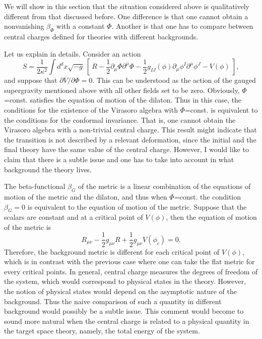 \documentclass[a4paper,a4paper]{article}
\begin{document}
We will show in this section that the situation considered above is qualitatively different from that 
discussed before. 
One difference is that one cannot obtain a nonvanishing $\beta_{\Phi}$ with a constant $\Phi$. 
Another is that one has to compare between central charges defined for theories with different backgrounds. 

Let us explain in details. 
Consider an action
\begin{equation}
S = \frac1{2\kappa^2}\int d^dx\sqrt{-g}\ \left[ \ R-\frac12\partial_\mu\Phi\partial^\mu\Phi
   -\frac12g_{IJ}(\phi)\partial_\mu\phi^I\partial^\mu\phi^J-V(\phi) \ \right],
\end{equation}
and suppose that $\partial V/\partial \Phi=0$. 
This can be understood as the action of the gauged supergravity mentioned above with all other fields set to be 
zero. 
Obviously, $\Phi$=const. satisfies the equation of motion of the dilaton. 
Thus in this case, the conditions for the existence of the Virasoro algebra with $\Phi$=const. is equivalent 
to the conditions for the conformal invariance. 
That is, one cannot obtain the Virasoro algebra with a non-trivial central charge. 
This result might indicate that the transition is not described by a relevant deformation, since the initial and 
the final theory have the same value of the central charge. 
However, I would like to claim that there is a subtle issue and one has to take into account in what background 
the theory lives. 

The beta-functional $\beta_G$ of the metric is a linear combination of the equations of motion of the metric and 
the dilaton, and thus when $\Phi$=const. the condition $\beta_G=0$ is equivalent to the equation of motion 
of the metric. 
Suppose that the scalars are constant and at a critical point of $V(\phi)$, then the equation of motion of the 
metric is 
\begin{equation}
R_{\mu\nu}-\frac12g_{\mu\nu}R+\frac12g_{\mu\nu}V(\phi_c) = 0.
\end{equation}
Therefore, the background metric is different for each critical point of $V(\phi)$, which is in contrast with the 
previous case where one can take the flat metric for every critical points. 
In general, central charge measures the degrees of freedom of the system, which would correspond to physical 
states in the theory. 
However, the notion of physical states would depend on the asymptotic nature of the background. 
Thus the naive comparison of such a quantity in different background would possibly be a subtle issue. 
This comment would become to sound more natural when the central charge is related to a physical quantity in the 
target space theory, namely, the total energy of the system. 
\end{document}
